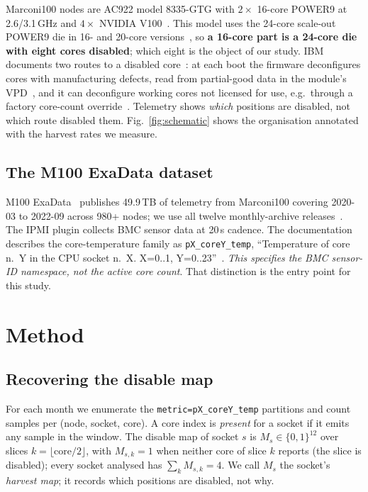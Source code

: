 \documentclass[10pt,conference]{IEEEtran}
\begin{document}
Marconi100 nodes are AC922 model 8335-GTG with $2\times$ 16-core POWER9 at 2.6/3.1\,GHz and
$4\times$ NVIDIA V100~\cite{ibm_ac922,cineca_m100,top500_m100}. This model uses the 24-core
scale-out POWER9 die in 16- and 20-core versions~\cite{ibm_ac922}, so \textbf{a 16-core part is a
24-core die with eight cores disabled}; which eight is the object of our study. IBM documents two
routes to a disabled core~\cite[p.~311]{ibm_p9um}: at each boot the firmware deconfigures cores
with manufacturing defects, read from partial-good data in the module's VPD~\cite{hostboot_p9}, and
it can deconfigure working cores not licensed for use, e.g.\ through a factory core-count
override~\cite{ibm_deconfig}. Telemetry shows \emph{which} positions are disabled, not which route
disabled them. Fig.~\ref{fig:schematic} shows the organisation annotated with the harvest rates we
measure.

\subsection{The M100 ExaData dataset}
M100 ExaData~\cite{borghesi2023m100} publishes 49.9\,TB of telemetry from Marconi100 covering
2020-03 to 2022-09 across 980+ nodes; we use all twelve monthly-archive
releases~\cite{m100_zenodo}. The IPMI plugin collects BMC sensor data at 20\,s cadence.
The documentation describes the core-temperature family as \texttt{pX\_coreY\_temp}, ``Temperature
of core n.\ Y in the CPU socket n.\ X. X=0..1, Y=0..23''~\cite{exadata_repo}. \emph{This specifies
the BMC sensor-ID namespace, not the active core count}. That distinction is the entry point for
this study.

\section{Method}
\label{sec:method}
\subsection{Recovering the disable map}
For each month we enumerate the \texttt{metric=pX\_coreY\_temp} partitions and count samples per
(node, socket, core). A core index is \emph{present} for a socket if it emits any sample in the
window. The disable map of socket $s$ is $M_s\in\{0,1\}^{12}$ over slices
$k=\lfloor \mathrm{core}/2 \rfloor$, with $M_{s,k}=1$ when neither core of slice $k$ reports (the
slice is disabled); every socket analysed has $\sum_k M_{s,k}=4$. We call $M_s$ the socket's
\emph{harvest map}; it records which positions are disabled, not why.
\end{document}
